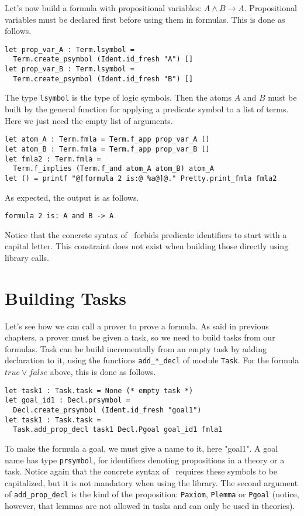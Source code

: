 Let's now build a formula with propositional variables: $A \land B
\rightarrow A$. Propositional variables must be declared first before
using them in formulas. This is done as follows.
\begin{verbatim}
let prop_var_A : Term.lsymbol =
  Term.create_psymbol (Ident.id_fresh "A") []
let prop_var_B : Term.lsymbol =
  Term.create_psymbol (Ident.id_fresh "B") []
\end{verbatim}
The type \texttt{lsymbol} is the type of logic symbols. Then the atoms $A$ and $B$
must be built by the general function for applying a predicate symbol to a list of terms. Here we just need the empty list of arguments.
\begin{verbatim}
let atom_A : Term.fmla = Term.f_app prop_var_A []
let atom_B : Term.fmla = Term.f_app prop_var_B []
let fmla2 : Term.fmla =
  Term.f_implies (Term.f_and atom_A atom_B) atom_A
let () = printf "@[formula 2 is:@ %a@]@." Pretty.print_fmla fmla2
\end{verbatim}

As expected, the output is as follows.
\begin{verbatim}
formula 2 is: A and B -> A
\end{verbatim}
Notice that the concrete syntax of \why\ forbids predicate identifiers
to start with a capital letter. This constraint does not exist when
building those directly using library calls.

\section{Building Tasks}

Let's see how we can call a prover to prove a formula. As said in
previous chapters, a prover must be given a task, so we need to build
tasks from our formulas. Task can be build incrementally from an empty
task by adding declaration to it, using the functions
\texttt{add\_*\_decl} of module \texttt{Task}. For the formula $true \lor
false$ above, this is done as follows.
\begin{verbatim}
let task1 : Task.task = None (* empty task *)
let goal_id1 : Decl.prsymbol =
  Decl.create_prsymbol (Ident.id_fresh "goal1")
let task1 : Task.task =
  Task.add_prop_decl task1 Decl.Pgoal goal_id1 fmla1
\end{verbatim}
To make the formula a goal, we must give a name to it, here "goal1". A
goal name has type \texttt{prsymbol}, for identifiers denoting
propositions in a theory or a task. Notice again that the concrete
syntax of \why\ requires these symbols to be capitalized, but it is not
mandatory when using the library. The second argument of
\texttt{add\_prop\_decl} is the kind of the proposition:
\texttt{Paxiom}, \texttt{Plemma} or \texttt{Pgoal}
(notice, however, that lemmas are not allowed in tasks
and can only be used in theories).


